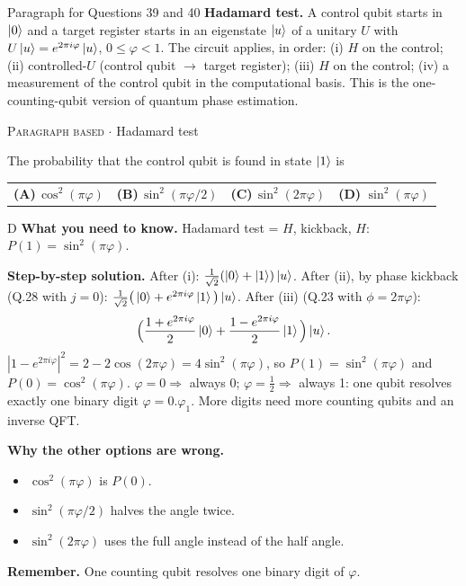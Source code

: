 \documentclass[11pt,a4paper]{article}
\newcommand{\optlabel}[1]{\textbf{(#1)}}
\newcommand{\correctlabel}[1]{\textcolor{okgreen}{\textbf{(#1)}\,\ding{51}}}
\newenvironment{qitem}[1]{\begin{list}{}{\setlength{\leftmargin}{3.3em}\setlength{\labelwidth}{3.1em}%
  \setlength{\labelsep}{0.2em}\setlength{\topsep}{3pt}\setlength{\parsep}{3pt}}\item[\textbf{Q.#1}\hfill]}{\end{list}}
\newcommand{\qsep}{\par\vspace{2pt}{\color{black!15}\hrule}\vspace{4pt}}
\newcommand{\qmeta}[2]{{\footnotesize\color{black!60}\textsc{#1} \;$\cdot$\; #2}\par}
\begin{document}
\begin{passagebox}{Paragraph for Questions 39 and 40}
\textbf{Hadamard test.} A control qubit starts in $\ket{0}$ and a target register starts in an eigenstate $\ket{u}$
of a unitary $U$ with $U\ket{u} = e^{2\pi i\varphi}\ket{u}$, $0 \le \varphi < 1$. The circuit applies, in order:
(i) $H$ on the control; (ii) controlled-$U$ (control qubit $\to$ target register); (iii) $H$ on the control;
(iv) a measurement of the control qubit in the computational basis. This is the one-counting-qubit version of quantum
phase estimation.
\end{passagebox}
\begin{qitem}{39}
\qmeta{Paragraph based}{Hadamard test}
The probability that the control qubit is found in state $\ket1$ is
\par\smallskip\noindent\begin{tabularx}{\linewidth}{@{}*{4}{L}@{}}
\optlabel{A}\,$\cos^2(\pi\varphi)$ & \optlabel{B}\,$\sin^2(\pi\varphi/2)$ & \optlabel{C}\,$\sin^2(2\pi\varphi)$ & \correctlabel{D}\,$\sin^2(\pi\varphi)$
\end{tabularx}
\end{qitem}
\begin{solbox}{D}
\textbf{\color{brand}What you need to know.} Hadamard test = $H$, kickback, $H$: $P(1) = \sin^2(\pi\varphi)$.

\textbf{\color{brand}Step-by-step solution.} After (i): $\frac{1}{\sqrt2}(\ket0 + \ket1)\ket u$. After (ii), by phase kickback (Q.28 with $j = 0$):
$\frac{1}{\sqrt2}\big(\ket0 + e^{2\pi i\varphi}\ket1\big)\ket u$. After (iii) (Q.23 with $\phi = 2\pi\varphi$):
\[ \Big(\frac{1 + e^{2\pi i\varphi}}{2}\ket0 + \frac{1 - e^{2\pi i\varphi}}{2}\ket1\Big)\ket u . \]
$|1 - e^{2\pi i\varphi}|^2 = 2 - 2\cos(2\pi\varphi) = 4\sin^2(\pi\varphi)$, so $P(1) = \sin^2(\pi\varphi)$ and $P(0) = \cos^2(\pi\varphi)$.
$\varphi = 0 \Rightarrow$ always 0; $\varphi = \frac12 \Rightarrow$ always 1: one qubit resolves exactly one binary digit
$\varphi = 0.\varphi_1$. More digits need more counting qubits and an inverse QFT.

\textbf{\color{brand}Why the other options are wrong.}
\begin{itemize}[leftmargin=2.4em, itemsep=1pt, topsep=2pt]
\item[\textbf{(A)}] $\cos^2(\pi\varphi)$ is $P(0)$.
\item[\textbf{(B)}] $\sin^2(\pi\varphi/2)$ halves the angle twice.
\item[\textbf{(C)}] $\sin^2(2\pi\varphi)$ uses the full angle instead of the half angle.
\end{itemize}
\textbf{\color{brand}Remember.} One counting qubit resolves one binary digit of $\varphi$.
\end{solbox}
\qsep
\end{document}
